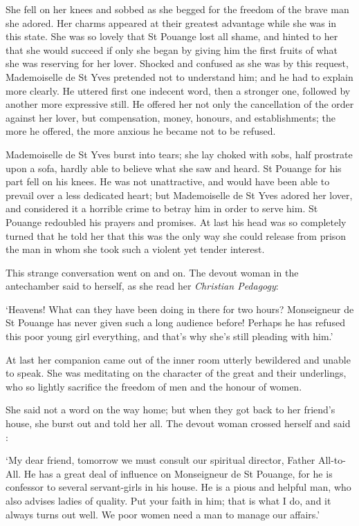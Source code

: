 \documentclass{article}
\begin{document}
\begin{center}
She fell on her knees and sobbed as she begged for the freedom of the brave man 
she adored. Her charms appeared at their greatest advantage while she was in this 
state. She was so lovely that St Pouange lost all shame, and hinted to her that 
she would succeed if only she began by giving him the first fruits of what she 
was reserving for her lover. Shocked and confused as she was by this request, Mademoiselle 
de St Yves pretended not to understand him; and he had to explain more clearly. 
He uttered first one indecent word, then a stronger one, followed by another more 
expressive still. He offered her not only the cancellation of the order against 
her lover, but compensation, money, honours, and establishments; the more he offered, 
the more anxious he became not to be refused. 

Mademoiselle de St Yves burst into tears; she lay choked with sobs, half prostrate 
upon a sofa, hardly able to believe what she saw and heard. St Pouange for his 
part fell on his knees. He was not unattractive, and would have been able to prevail 
over a less dedicated heart; but Mademoiselle de St Yves adored her lover, and 
considered it a horrible crime to betray him in order to serve him. St Pouange 
redoubled his prayers and promises. At last his head was so completely turned that 
he told her that this was the only way she could release from prison the man in 
whom she took such a violent yet tender interest. 

This strange conversation went on and on. The devout woman in the antechamber said 
to herself, as she read her \textit{Christian Pedagogy}: 

`Heavens! What can they have been doing in there for two hours? Monseigneur de 
St Pouange has never given such a long audience before! Perhaps he has refused 
this poor young girl everything, and that's why she's still pleading with him.' 

At last her companion came out of the inner room utterly bewildered and unable 
to speak. She was meditating on the character of the great and their underlings, 
who so lightly sacrifice the freedom of men and the honour of women. 

She said not a word on the way home; but when they got back to her friend's house, 
she burst out and told her all. The devout woman crossed herself and said : 

`My dear friend, tomorrow we must consult our spiritual director, Father All-to-All. 
He has a great deal of influence on Monseigneur de St Pouange, for he is confessor 
to several servant-girls in his house. He is a pious and helpful man, who also 
advises ladies of quality. Put your faith in him; that is what I do, and it always 
turns out well. We poor women need a man to manage our affairs.' 


\end{center}
\end{document}
